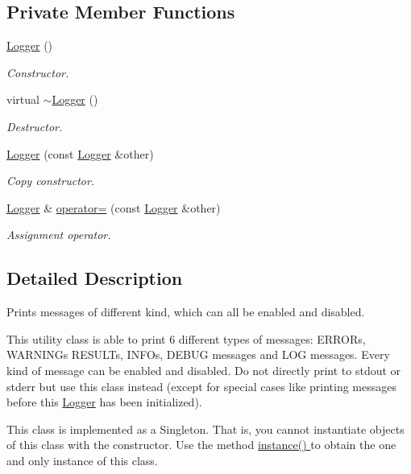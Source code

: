 \subsection*{Private Member Functions}
\begin{DoxyCompactItemize}
\item 
\hyperlink{classLogger_abc41bfb031d896170c7675fa96a6b30c}{Logger} ()
\begin{DoxyCompactList}\small\item\em Constructor. \end{DoxyCompactList}\item 
virtual \hyperlink{classLogger_acb668a9e186a25fbaad2e4af6d1ed00a}{$\sim$\-Logger} ()
\begin{DoxyCompactList}\small\item\em Destructor. \end{DoxyCompactList}\item 
\hyperlink{classLogger_a25dabaa7b9631ab7e7988b6b610c6f3a}{Logger} (const \hyperlink{classLogger}{Logger} \&other)
\begin{DoxyCompactList}\small\item\em Copy constructor. \end{DoxyCompactList}\item 
\hyperlink{classLogger}{Logger} \& \hyperlink{classLogger_aa2c434460d394a7600e6806d10df9c8c}{operator=} (const \hyperlink{classLogger}{Logger} \&other)
\begin{DoxyCompactList}\small\item\em Assignment operator. \end{DoxyCompactList}\end{DoxyCompactItemize}


\subsection{Detailed Description}
Prints messages of different kind, which can all be enabled and disabled. 

This utility class is able to print 6 different types of messages\-: E\-R\-R\-O\-Rs, W\-A\-R\-N\-I\-N\-Gs R\-E\-S\-U\-L\-Ts, I\-N\-F\-Os, D\-E\-B\-U\-G messages and L\-O\-G messages. Every kind of message can be enabled and disabled. Do not directly print to stdout or stderr but use this class instead (except for special cases like printing messages before this \hyperlink{classLogger}{Logger} has been initialized).

This class is implemented as a Singleton. That is, you cannot instantiate objects of this class with the constructor. Use the method \hyperlink{classLogger_a4aa4d7c3b98f6e12e7ea8253da5ea0cd}{instance() } to obtain the one and only instance of this class.

